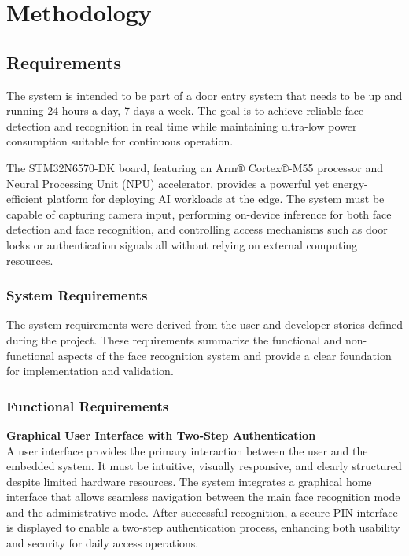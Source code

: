 \chapter{Methodology}
\setlength{\parindent}{0pt}
\section{Requirements}


The system is intended to be part of a door entry system that needs to be up and running 24 hours a day, 7 days a week. The goal is to achieve reliable face detection and recognition in real time while maintaining ultra-low power consumption suitable for continuous operation.

The STM32N6570-DK board, featuring an Arm® Cortex®-M55 processor and Neural Processing Unit (NPU) accelerator, provides a powerful yet energy-efficient platform for deploying AI workloads at the edge. The system must be capable of capturing camera input, performing on-device inference for both face detection and face recognition, and controlling access mechanisms such as door locks or authentication signals all without relying on external computing resources.

\subsection*{System Requirements}

The system requirements were derived from the user and developer stories defined during the project. These requirements summarize the functional and non-functional aspects of the face recognition system and provide a clear foundation for implementation and validation.






\subsection*{Functional Requirements}

\textbf{Graphical User Interface with Two-Step Authentication}\\
A user interface provides the primary interaction between the user and the embedded system. It must be intuitive, visually responsive, and clearly structured despite limited hardware resources. The system integrates a graphical home interface that allows seamless navigation between the main face recognition mode and the administrative mode. After successful recognition, a secure PIN interface is displayed to enable a two-step authentication process, enhancing both usability and security for daily access operations.

